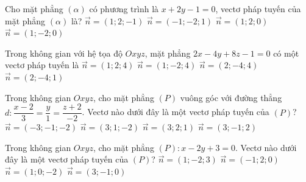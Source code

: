 \begin{ex}%
	Cho mặt phẳng $(\alpha)$ có phương  trình là $x+2 y-1=0$, vectơ pháp tuyến của mặt phẳng $(\alpha)$ là?
	 \choice
		{$\overrightarrow{n}=(1;  2;-1)$}
		{$\overrightarrow{n}=(-1;-2; 1)$} 
		{\True  $\overrightarrow{n}=(1; 2; 0)$}
		 {$\overrightarrow{n}=(1;-2; 0)$}
\end{ex}

\begin{ex}%
	Trong không gian với hệ tọa độ $Oxyz$, mặt phẳng  $2x - 4y + 8z - 1 = 0$ có một vectơ pháp tuyến là
	 \choice
		{$\overrightarrow{n}=(1; 2;  4)$}
		{\True $\overrightarrow{n}=(1;  -2; 4)$}
		{$\overrightarrow{n}=(2;  -4; 4)$}
		{$\overrightarrow{n}=(2;  -4; 1)$}
\end{ex}

\begin{ex}%
	[GV:Xuan  Vy Pham]
	Trong không gian $Oxyz$, cho mặt phẳng $(P)$ vuông góc với đường thẳng \\$d \colon  \dfrac{x-2}{3}=\dfrac{y}{1}=\dfrac{z+2}{-2}$. Vectơ nào dưới đây là một vectơ pháp tuyến của $(P)$?
	\choice 
		{$\overrightarrow{n}=\left(-3;-1;-2\right)$} 
		 {\True $\overrightarrow{n}=\left(3;1;-2\right)$}
		{$\overrightarrow{n}=\left(3;2;1\right)$} 
		 {$\overrightarrow{n}=\left(3;-1;2\right)$}
\end{ex}

\begin{ex}%
	Trong không gian $Oxyz$, cho mặt phẳng $(P):x-2y+3=0$. Vectơ nào dưới đây là  một vectơ pháp tuyến của $(P)$?
	 \choice
		{$\overrightarrow{n}=(1;-2;3)$} 
		{\True $\overrightarrow{n}=(-1;2;0)$} 
		{$\overrightarrow{n}=(1;0;-2)$} 
		 {$\overrightarrow{n}=(3;-1;0)$}
\end{ex}

